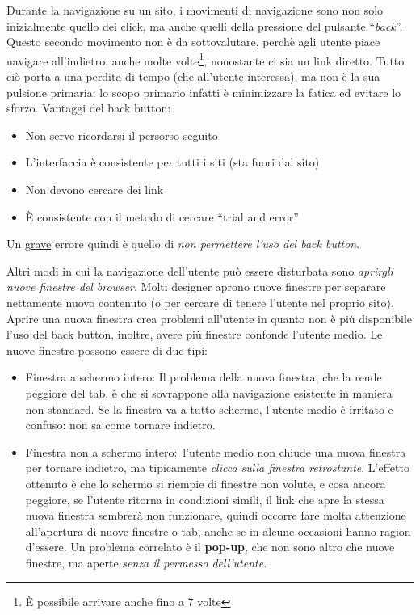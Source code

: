 Durante la navigazione su un sito, i movimenti di navigazione sono non solo inizialmente quello dei click, ma anche quelli della pressione del pulsante ``\textit{back}''. Questo secondo movimento non \`e da sottovalutare, perch\`e agli utente piace navigare all'indietro, anche molte volte\footnote{\`E possibile arrivare anche fino a 7 volte}, nonostante ci sia un link diretto. Tutto ci\`o porta a una perdita di tempo (che all'utente interessa), ma non \`e la sua pulsione primaria: lo scopo primario infatti \`e minimizzare la fatica ed evitare lo sforzo. Vantaggi del back button:
\begin{itemize}

\item Non serve ricordarsi il persorso seguito

\item L'interfaccia \`e consistente per tutti i siti (sta fuori dal sito)

\item Non devono cercare dei link

\item \`E consistente con il metodo di cercare ``trial and error''

\end{itemize}

Un \underline{grave} errore quindi \`e quello di \textit{non permettere l'uso del back button}.

Altri modi in cui la navigazione dell'utente pu\`o essere disturbata sono \textit{aprirgli nuove finestre del browser}. Molti designer aprono nuove finestre per separare nettamente nuovo contenuto (o per cercare di tenere l'utente nel proprio sito). Aprire una nuova finestra crea problemi all'utente in quanto non \`e pi\`u disponibile l'uso del back button, inoltre, avere pi\`u finestre confonde l'utente medio. Le nuove finestre possono essere di due tipi:
\begin{itemize}

\item Finestra a schermo intero: Il problema della nuova finestra, che la rende peggiore del tab, \`e che si sovrappone alla navigazione esistente in maniera non-standard. Se la finestra va a tutto schermo, l'utente medio \`e irritato e confuso: non sa come tornare indietro.

\item Finestra non a schermo intero:\ l'utente medio non chiude una nuova finestra per tornare indietro, ma tipicamente \textit{clicca sulla finestra retrostante}. L'effetto ottenuto \`e che lo schermo si riempie di finestre non volute, e cosa ancora peggiore, se l'utente ritorna in condizioni simili, il link che apre la stessa nuova finestra sembrer\`a non funzionare, quindi occorre fare molta attenzione all'apertura di nuove finestre o tab, anche se in alcune occasioni hanno ragion d'essere. Un problema correlato \`e il \textbf{pop-up}, che non sono altro che nuove finestre, ma aperte \textit{senza il permesso dell'utente}.

\end{itemize}
